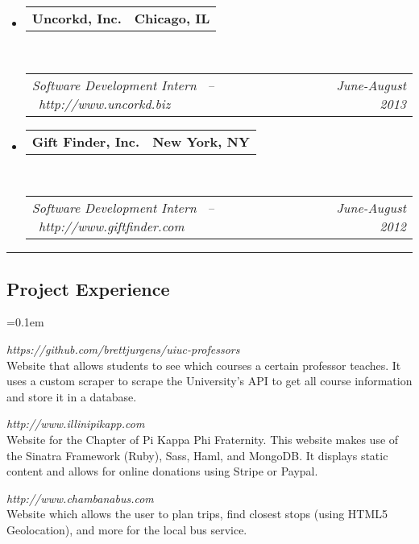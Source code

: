 \documentclass[10pt,letterpaper]{article}
\makeatletter
\newcommand{\headerrow}[2]
{\begin{tabular*}{\linewidth}{l@{\extracolsep{\fill}}r}
	#1 &
	#2 \\
\end{tabular*}}
\makeatother
\begin{document}
\begin{itemize}
	\item
	\headerrow
		{\textbf{Uncorkd, Inc.}}
		{\textbf{Chicago, IL}}
	\\
	\headerrow
		{\emph{Software Development Intern \ -- \ http://www.uncorkd.biz}}
		{\emph{June-August 2013}}
	\vspace{-1.5em}

	\item
	\headerrow
		{\textbf{Gift Finder, Inc.}}
		{\textbf{New York, NY}}
	\\
	\headerrow
		{\emph{Software Development Intern \ -- \ http://www.giftfinder.com}}
		{\emph{June-August 2012}}
	\vspace{-1.5em}

\end{itemize}

\hrule
\vspace{-0.4em}
\subsection*{Project Experience}
\begin{description}[leftmargin=0pt]
	\parskip=0.1em

	\item[UIUC Professors] {\emph{https://github.com/brettjurgens/uiuc-professors}}\hfill\\
      Website that allows students to see which courses a certain professor
      teaches. It uses a custom scraper to scrape the University's API to get
      all course information and store it in a database.

      \item[Pi Kappa Phi Illinois Chapter] {\emph{http://www.illinipikapp.com}}\hfill\\
      Website for the Chapter of Pi Kappa Phi Fraternity. This website makes use of the
      Sinatra Framework (Ruby), Sass, Haml, and MongoDB. It displays static
      content and allows for online donations using Stripe or Paypal.

	\item[Chambana Bus] {\emph{http://www.chambanabus.com}}\hfill\\
      Website which allows the user to plan trips, find closest stops (using HTML5
	Geolocation), and more for the local bus service.

\end{description}
\end{document}
